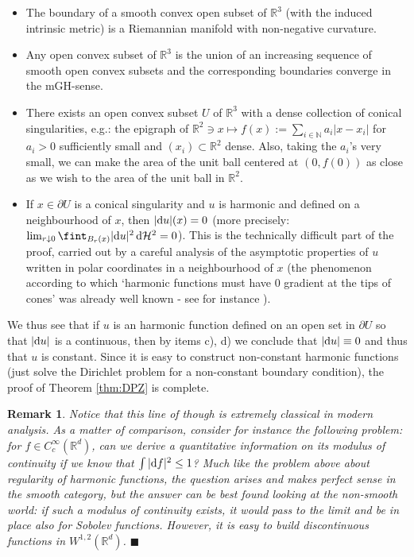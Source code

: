 \documentclass[11pt]{article}
\numberwithin{equation}{section}
\newtheorem{remark}[theorem]{Remark}
\newcommand{\N}{\mathbb{N}}
\newcommand{\R}{\mathbb{R}}
\renewcommand{\d}{{\rm d}}
\newcommand{\fr}{\penalty-20\null\hfill$\blacksquare$}         %
\begin{document}
\begin{itemize}
\item[a)] The boundary of a smooth convex open subset of $\R^3$ (with the induced intrinsic metric) is a Riemannian manifold with non-negative curvature.
\item[b)] Any open convex subset of $\R^3$ is the union of an increasing sequence of smooth open convex subsets and the corresponding boundaries converge in the mGH-sense.
\item[c)]\label{it:c} There exists an open convex subset $U$ of $\R^3$ with a dense collection of conical singularities, e.g.: the epigraph of $\R^2\ni x\mapsto f(x):=\sum_{i\in\N}a_i|x-x_i|$ for $a_i>0$ sufficiently small and $(x_i)\subset\R^2$ dense. Also, taking the $a_i$'s very small, we can make the area of the unit ball centered at $(0,f(0))$ as close  as we wish to the area of the unit ball in $\R^2$.
\item[d)]\label{it:d} If $x\in \partial U$ is a conical singularity and $u$ is harmonic and defined on a neighbourhood of $x$, then $|\d u|(x)=0$ (more precisely: $\lim_{r\downarrow0}\fint_{B_r(x)}|\d u|^2\,\d\mathcal H^2=0$). This is the technically difficult part of the proof, carried out by a careful analysis of the asymptotic properties of $u$ written in polar coordinates in a neighbourhood of $x$ (the phenomenon according to which `harmonic functions must have 0 gradient at the tips of cones' was already well known -  see for instance \cite[Example 2.14]{ChNa15}).
\end{itemize}
We thus see that if $u$ is an harmonic function defined on an open set in $\partial U$ so that $|\d u|$ is a continuous, then by items c), d) we conclude that $|\d u|\equiv 0$ and thus that $u$ is constant. Since it is easy to construct non-constant harmonic functions (just solve the Dirichlet problem for a non-constant boundary condition), the proof of Theorem \ref{thm:DPZ} is complete.

\begin{remark}{\rm Notice that this line of though is extremely classical in modern analysis. As a matter of comparison, consider for instance the following problem: for $f\in C^\infty_c(\R^d)$, can we derive a quantitative information on its modulus of continuity if we know that $\int|\d f|^2\leq1$? Much like the problem above about regularity of harmonic functions, the question arises and makes perfect sense in the smooth category, but the answer can be best found looking at the non-smooth world: if such a modulus of continuity exists, it would pass to the limit and be in place also for Sobolev functions. However, it is easy to build  discontinuous functions in $W^{1,2}(\R^d)$.
}\fr\end{remark}
\end{document}
